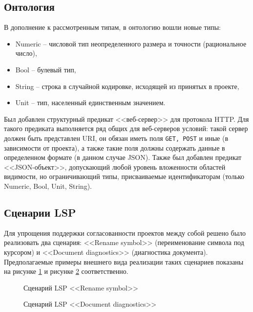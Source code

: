 \subsection{Онтология}

В дополнение к рассмотренным типам, в онтологию вошли новые типы:
\begin{itemize}
    \item Numeric -- числовой тип неопределенного размера и точности (рациональное число),
    \item Bool -- булевый тип,
    \item String -- строка в случайной кодировке, исходящей из принятых в проекте,
    \item Unit -- тип, населенный единственным значением.
\end{itemize}

Был добавлен структурный предикат <<веб-сервер>> для протокола HTTP. Для такого предиката выполняется ряд
общих для веб-серверов условий: такой сервер должен быть представлен URI, он обязан иметь поля \texttt{GET, POST} и иные (в зависимости
от проекта), а также такие поля должны содержать данные в определенном формате (в данном случае JSON). Также был добавлен предикат
<<JSON-объект>>, допускающий любой уровень вложенности областей видимости, но ограничивающий типы, присваиваемые идентификаторам (только
Numeric, Bool, Unit, String).

\subsection{Сценарии LSP}

Для упрощения поддержки согласованности проектов между собой решено было реализовать
два сценария: <<Rename symbol>> (переименование символа под курсором) и <<Document diagnostics>> (диагностика документа).
Предполагаемые примеры внешнего вида реализации таких сценариев показаны на рисунке \ref{fig:lsp-rename} и рисунке \ref{fig:lsp-diagnostics}
соответственно.

\begin{figure}[H]
    \centering
    \caption{Сценарий LSP <<Rename symbol>>}
    \label{fig:lsp-rename}
\end{figure}

\begin{figure}[H]
    \centering
    \caption{Сценарий LSP <<Document diagnostics>>}
    \label{fig:lsp-diagnostics}
\end{figure}

